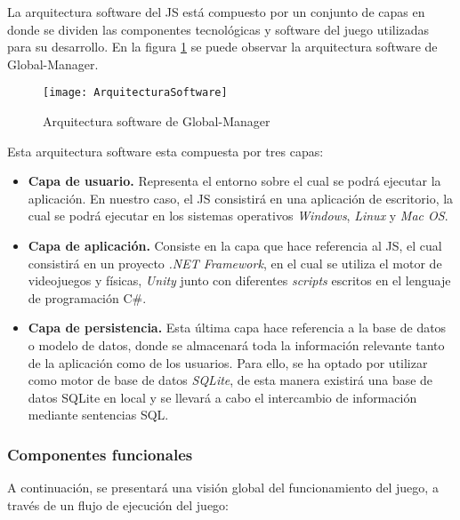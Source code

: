 La arquitectura software del JS está compuesto por un conjunto de capas en donde se dividen las componentes tecnológicas y software del juego utilizadas para su desarrollo. En la figura \ref{fig:ArquitecturaSoftware} se puede observar la arquitectura software de Global-Manager.

\begin{figure}[htb]
	\centering
	\texttt{[image: ArquitecturaSoftware]}
	\caption[Arquitectura software de Global-Manager]{Arquitectura software de Global-Manager}
	\label{fig:ArquitecturaSoftware}
\end{figure}

Esta arquitectura software esta compuesta por tres capas:

\begin{itemize}
	\item \textbf{Capa de usuario.} Representa el entorno sobre el cual se podrá ejecutar la aplicación. En nuestro caso, el JS consistirá en una aplicación de escritorio, la cual se podrá ejecutar en los sistemas operativos \emph{Windows}, \emph{Linux} y \emph{Mac OS}.
	\item \textbf{Capa de aplicación.} Consiste en la capa que hace referencia al JS, el cual consistirá en un proyecto \emph{.NET Framework}, en el cual se utiliza el motor de videojuegos y físicas, \emph{Unity} junto con diferentes \emph{scripts} escritos en el lenguaje de programación C\#.  
	\item \textbf{Capa de persistencia.} Esta última capa hace referencia a la base de datos o modelo de datos, donde se almacenará toda la información relevante tanto de la aplicación como de los usuarios. Para ello, se ha optado por utilizar como motor de base de datos \emph{SQLite}, de esta manera existirá una base de datos SQLite en local y se llevará a cabo el intercambio de información mediante sentencias SQL.
\end{itemize}

\subsubsection*{Componentes funcionales}
\label{sec:ComponentesFuncionales}

A continuación, se presentará una visión global del funcionamiento del juego, a través de un flujo de ejecución del juego:

